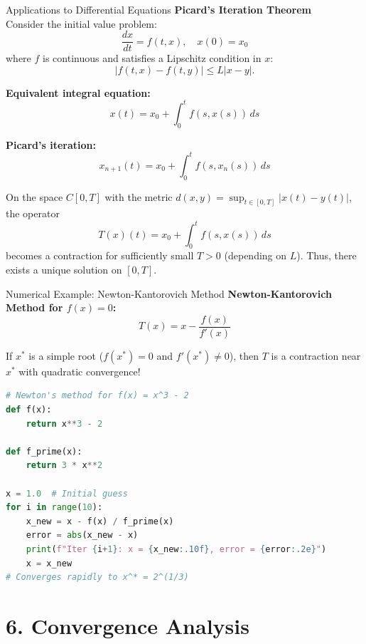 \documentclass[aspectratio=169,10pt]{beamer}
\begin{document}
\begin{frame}{Applications to Differential Equations}
    \textbf{Picard's Iteration Theorem} \\
    Consider the initial value problem:
    \[
        \frac{dx}{dt} = f(t, x), \quad x(0) = x_0
    \]
    where $f$ is continuous and satisfies a Lipschitz condition in $x$:
    \[
        |f(t, x) - f(t, y)| \leq L |x - y|.
    \]

    \vspace{0.3cm}
    \textbf{Equivalent integral equation:}
    \[
        x(t) = x_0 + \int_0^t f(s, x(s)) \, ds
    \]

    \vspace{0.3cm}
    \textbf{Picard's iteration:}
    \[
        x_{n+1}(t) = x_0 + \int_0^t f(s, x_n(s)) \, ds
    \]

    \vspace{0.3cm}
    On the space $C[0, T]$ with the metric $d(x, y) = \sup_{t \in [0,T]} |x(t) - y(t)|$, the operator
    \[
        T(x)(t) = x_0 + \int_0^t f(s, x(s)) \, ds
    \]
    becomes a contraction for sufficiently small $T > 0$ (depending on $L$). Thus, there exists a unique solution on $[0, T]$.
\end{frame}

\begin{frame}[fragile]{Numerical Example: Newton-Kantorovich Method}
    \textbf{Newton-Kantorovich Method for $f(x) = 0$:}
    \[
        T(x) = x - \frac{f(x)}{f'(x)}
    \]

    \vspace{0.3cm}
    If $x^*$ is a simple root ($f(x^*) = 0$ and $f'(x^*) \neq 0$), then $T$ is a contraction near $x^*$ with quadratic convergence!

    \vspace{0.3cm}
    \begin{lstlisting}[language=Python]
# Newton's method for f(x) = x^3 - 2
def f(x):
    return x**3 - 2

def f_prime(x):
    return 3 * x**2

x = 1.0  # Initial guess
for i in range(10):
    x_new = x - f(x) / f_prime(x)
    error = abs(x_new - x)
    print(f"Iter {i+1}: x = {x_new:.10f}, error = {error:.2e}")
    x = x_new
# Converges rapidly to x^* = 2^(1/3)
    \end{lstlisting}
\end{frame}

\section{6. Convergence Analysis}
\end{document}
